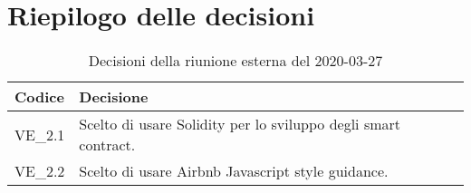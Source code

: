 \section{Riepilogo delle decisioni}
\begin{longtable}{
	 >{\centering}p{} >{}p{} }

	\caption{Decisioni della riunione esterna del 2020-03-27}\\

	\textbf{\color{white}Codice} &
	\textbf{\color{white}Decisione}
	\tabularnewline
	\endhead

	VE\_2.1 & Scelto di usare Solidity per lo sviluppo degli smart contract. \\
	VE\_2.2 & Scelto di usare Airbnb Javascript style guidance. \\
\end{longtable}
